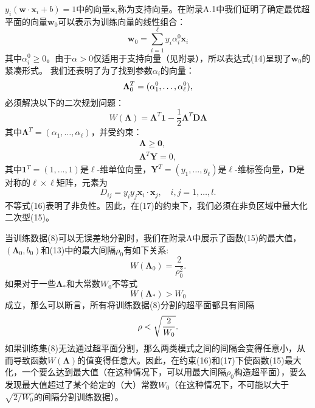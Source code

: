 \documentclass[lang=cn,11pt,a4paper]{elegantpaper}
\begin{document}
	$y_i(\mathbf{w}·\mathbf{x}_i+b)=1$中的向量$\mathbf{x}_i$称为支持向量。在附录A.1中我们证明了确定最优超平面的向量$\mathbf{w}_0$可以表示为训练向量的线性组合：
	\begin{equation}
		\mathbf{w}_0=\sum_{i=1}^{\ell}{y_i\alpha_i^0\mathbf{x}_i}\tag{14}
	\end{equation}
	其中$\alpha_i^0\geq0$。由于$\alpha>0$仅适用于支持向量（见附录），所以表达式(14)呈现了$\mathbf{w}_0$的紧凑形式。
	我们还表明了为了找到参数$\alpha_i$的向量：
	\begin{equation}
		\mathbf{\Lambda}_0^T=(\alpha_1^0,\dots,\alpha_\ell^0),\notag
	\end{equation}
	必须解决以下的二次规划问题：
	\begin{equation}
		W(\mathbf{\Lambda})=\mathbf{\Lambda}^T\mathbf{1}-\frac{1}{2}\mathbf{\Lambda}^T\mathbf{D\Lambda}\tag{15}
	\end{equation}
	其中$\mathbf{\Lambda}^T=(\alpha_1,\dots,\alpha_\ell)$，并受约束：
	\begin{align}
		\mathbf{\Lambda}\geq\mathbf{0},\tag{16}\\ 
		\mathbf{\Lambda}^T\mathbf{Y}=0,\tag{17}
	\end{align}
	其中$\mathbf{1}^T=(1,\dots,1)$是$\ell$-维单位向量，$\mathbf{Y}^T=(y_1,\dots,y_\ell)$是$\ell$-维标签向量，$\mathbf{D}$是对称的$\ell\times\ell$矩阵，元素为
	\begin{equation}
		D_{ij}=y_iy_j\mathbf{x}_i·\mathbf{x}_j,\quad i,j=1,\dots,l.\tag{18}
	\end{equation}
	不等式(16)表明了非负性。因此，在(17)的约束下，我们必须在非负区域中最大化二次型(15)。

	当训练数据(8)可以无误差地分割时，我们在附录A中展示了函数(15)的最大值，$(\mathbf{\Lambda}_0,b_0)$和(13)中的最大间隔$\rho_0$有如下关系:
	\begin{equation}
		W(\mathbf{\Lambda}_0)=\frac{2}{\rho_0^2}.\tag{19}
	\end{equation}
	如果对于一些$\mathbf{\Lambda}_*$和大常数$W_0$不等式
	\begin{equation}
		W(\mathbf{\Lambda}_*)> W_0\tag{20}
	\end{equation}
	成立，那么可以断言，所有将训练数据(8)分割的超平面都具有间隔
	\begin{equation}
		\rho< \sqrt{\frac{2}{W_0}}.\notag
	\end{equation}
	如果训练集(8)无法通过超平面分割，那么两类模式之间的间隔会变得任意小，从而导致函数$W(\mathbf{\Lambda})$的值变得任意大。因此，在约束(16)和(17)下使函数(15)最大化，一个要么达到最大值（在这种情况下，可以用最大间隔$\rho_0$构造超平面），要么发现最大值超过了某个给定的（大）常数$W_0$（在这种情况下，不可能以大于$\sqrt{2/W_0}$的间隔分割训练数据）。
\end{document}
